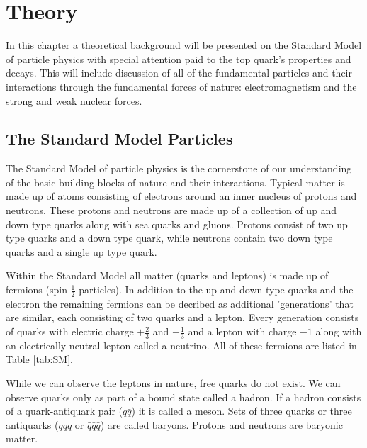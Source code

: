 
\chapter{Theory}
\label{ch:Theory}

In this chapter a theoretical background will be presented on the Standard Model of particle physics with special attention paid to the top quark's properties and decays.  This will include discussion of all of the fundamental particles and their interactions through the fundamental forces of nature: electromagnetism and the strong and weak nuclear forces.

\section{The Standard Model Particles}
\label{SMParticles}
The Standard Model of particle physics is the cornerstone of our understanding of the basic building blocks of nature and their interactions.  Typical matter is made up of atoms consisting of electrons around an inner nucleus of protons and neutrons.  These protons and neutrons are made up of a collection of up and down type quarks along with sea quarks and gluons.  Protons consist of two up type quarks and a down type quark, while neutrons contain two down type quarks and a single up type quark.  

Within the Standard Model all matter (quarks and leptons) is made up of fermions (spin-$\frac{1}{2}$ particles).  In addition to the up and down type quarks and the electron the remaining fermions can be decribed as additional 'generations' that are similar, each consisting of two quarks and a lepton.  Every generation consists of quarks with electric charge $+\frac{2}{3}$ and $-\frac{1}{3}$ and a lepton with charge $-1$ along with an electrically neutral lepton called a neutrino.  All of these fermions are listed in Table \ref{tab:SM}.  

While we can observe the leptons in nature, free quarks do not exist.  We can observe quarks only as part of a bound state called a hadron.  If a hadron consists of a quark-antiquark pair ($q\bar{q}$) it is called a meson.  Sets of three quarks or three antiquarks ($qqq$ or $\bar{q}\bar{q}\bar{q}$) are called baryons.  Protons and neutrons are baryonic matter.

